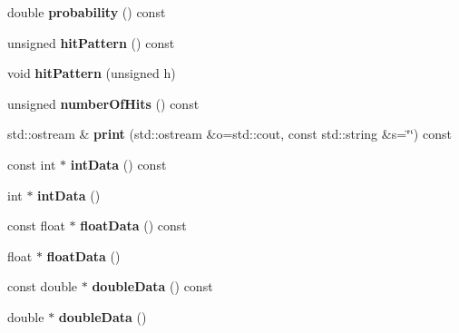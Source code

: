 \begin{DoxyCompactItemize}
\item 
double {\bfseries probability} () const \label{classTBTrack_1_1TrackFitResult_aba9d5aa99ef6d3c0c7c767f63e21191a}

\item 
unsigned {\bfseries hitPattern} () const \label{classTBTrack_1_1TrackFitResult_ad1988c2b480b8d45d9b92e6643a8f2b9}

\item 
void {\bfseries hitPattern} (unsigned h)\label{classTBTrack_1_1TrackFitResult_ac5b77c597472fbcf86b440940dbffc75}

\item 
unsigned {\bfseries numberOfHits} () const \label{classTBTrack_1_1TrackFitResult_a1911052615673f6341b65b4e874a7725}

\item 
std::ostream \& {\bfseries print} (std::ostream \&o=std::cout, const std::string \&s=\char`\"{}\char`\"{}) const \label{classTBTrack_1_1TrackFitResult_af6cc54a8c28eed7faf1a25680619c74e}

\item 
const int $\ast$ {\bfseries intData} () const \label{classTBTrack_1_1TrackFitResult_ad008025d62102edd1b766bcda8fca9d8}

\item 
int $\ast$ {\bfseries intData} ()\label{classTBTrack_1_1TrackFitResult_a9f6a52850d0d7fccf2fa679fefb156f9}

\item 
const float $\ast$ {\bfseries floatData} () const \label{classTBTrack_1_1TrackFitResult_af915d2a26e54410317c50e52072352a4}

\item 
float $\ast$ {\bfseries floatData} ()\label{classTBTrack_1_1TrackFitResult_acb8d400156d3413b0e1062530b87ecc9}

\item 
const double $\ast$ {\bfseries doubleData} () const \label{classTBTrack_1_1TrackFitResult_a91f32c7b577a192a2a97e645fec1c83c}

\item 
double $\ast$ {\bfseries doubleData} ()\label{classTBTrack_1_1TrackFitResult_a362625e95ba94f5de728a2cb3042c0cb}

\end{DoxyCompactItemize}
